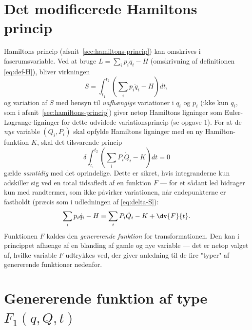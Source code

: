 \section{Det modificerede Hamiltons princip}

Hamiltons princip (afsnit~\ref{sec:hamiltons-princip}) kan omskrives i
faserumsvariable. Ved at bruge $L=\sum_i p_i\dot q_i - H$ (omskrivning
af definitionen \eqref{eq:def-H}), bliver virkningen
\begin{equation}
  S = \int_{t_1}^{t_2}\left(\sum_i p_i\dot q_i - H\right)dt,
\end{equation}
og variation af $S$ med hensyn til \emph{uafhængige} variationer i
$q_i$ og $p_i$ (ikke kun $q_i$, som i afsnit~\ref{sec:hamiltons-princip})
giver netop Hamiltons ligninger som Euler-Lagrange-ligninger for dette
udvidede variationsprincip (se opgave 1). For at de \emph{nye}
variable $(Q_i,P_i)$ skal opfylde Hamiltons ligninger med en ny
Hamilton-funktion $K$, skal det tilsvarende princip
\begin{equation}
  \delta\int_{t_1}^{t_2}\left(\sum_i P_i\dot Q_i - K\right)dt = 0
\end{equation}
gælde \emph{samtidig} med det oprindelige. Dette er sikret, hvis
integranderne kun adskiller sig ved en total tidsafledt af en funktion
$F$ — for et sådant led bidrager kun med randtermer, som ikke påvirker
variationen, når endepunkterne er fastholdt (præcis som i
udledningen af \eqref{eq:delta-S}):
\begin{equation}
  \sum_i p_i\dot q_i - H = \sum_i P_i\dot Q_i - K + \dv{F}{t}.
  \label{eq:genererende-betingelse}
\end{equation}
Funktionen $F$ kaldes den \emph{genererende funktion} for
transformationen. Den kan i princippet afhænge af en blanding af
gamle og nye variable — det er netop valget af, hvilke variable $F$
udtrykkes ved, der giver anledning til de fire "typer" af genererende
funktioner nedenfor.

\section{Genererende funktion af type $F_1(q,Q,t)$}

